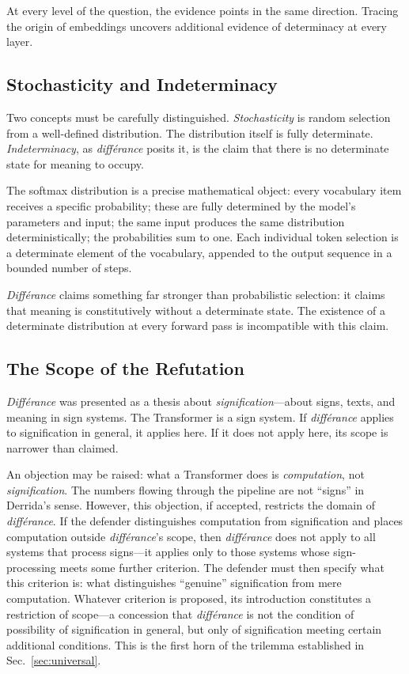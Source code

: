 \documentclass[a4paper,twocolumn,11pt]{article}
\begin{document}
At every level of the question, the evidence points in the same direction. Tracing the origin of embeddings uncovers additional evidence of determinacy at every layer.

\subsection{Stochasticity and Indeterminacy}
\label{sec:stochasticity}

Two concepts must be carefully distinguished. \emph{Stochasticity} is random selection from a well-defined distribution. The distribution itself is fully determinate. \emph{Indeterminacy}, as \emph{diff\'erance} posits it, is the claim that there is no determinate state for meaning to occupy.

The softmax distribution is a precise mathematical object: every vocabulary item receives a specific probability; these are fully determined by the model's parameters and input; the same input produces the same distribution deterministically; the probabilities sum to one. Each individual token selection is a determinate element of the vocabulary, appended to the output sequence in a bounded number of steps.

\emph{Diff\'erance} claims something far stronger than probabilistic selection: it claims that meaning is constitutively without a determinate state. The existence of a determinate distribution at every forward pass is incompatible with this claim.

\subsection{The Scope of the Refutation}
\label{sec:scope}

\emph{Diff\'erance} was presented as a thesis about \emph{signification}---about signs, texts, and meaning in sign systems. The Transformer is a sign system. If \emph{diff\'erance} applies to signification in general, it applies here. If it does not apply here, its scope is narrower than claimed.

An objection may be raised: what a Transformer does is \emph{computation}, not \emph{signification}. The numbers flowing through the pipeline are not ``signs'' in Derrida's sense. However, this objection, if accepted, restricts the domain of \emph{diff\'erance}. If the defender distinguishes computation from signification and places computation outside \emph{diff\'erance}'s scope, then \emph{diff\'erance} does not apply to all systems that process signs---it applies only to those systems whose sign-processing meets some further criterion. The defender must then specify what this criterion is: what distinguishes ``genuine'' signification from mere computation. Whatever criterion is proposed, its introduction constitutes a restriction of scope---a concession that \emph{diff\'erance} is not the condition of possibility of signification in general, but only of signification meeting certain additional conditions. This is the first horn of the trilemma established in Sec.~\ref{sec:universal}.
\end{document}
